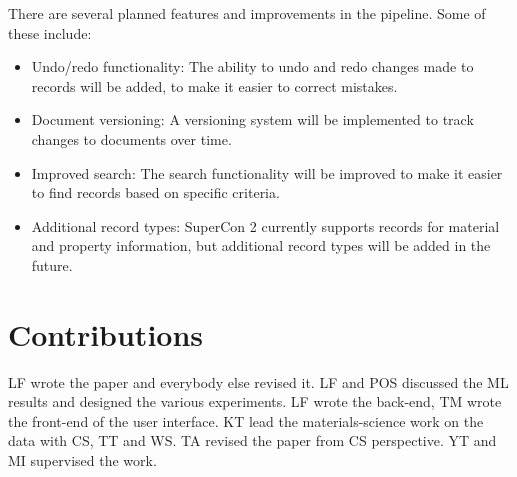 \documentclass[a4paper]{article}
\begin{document}
There are several planned features and improvements in the pipeline. Some of these include:

\begin{itemize}
    \item Undo/redo functionality: The ability to undo and redo changes made to records will be added, to make it easier to correct mistakes.
    \item Document versioning: A versioning system will be implemented to track changes to documents over time.
    \item Improved search: The search functionality will be improved to make it easier to find records based on specific criteria.
    \item Additional record types: SuperCon 2 currently supports records for material and property information, but additional record types will be added in the future.
\end{itemize}

\section*{Contributions}
LF wrote the paper and everybody else revised it. 
LF and POS discussed the ML results and designed the various experiments. 
LF wrote the back-end, TM wrote the front-end of the user interface. 
KT lead the materials-science work on the data with CS, TT and WS.
TA revised the paper from CS perspective.
YT and MI supervised the work. 




\end{document}
